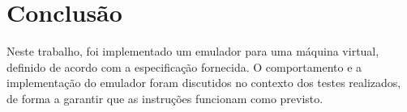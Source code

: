 \documentclass[10pt,a4paper]{article}
\numberwithin{equation}{section}
\begin{document}
\FloatBarrier

\section{Conclusão}

Neste trabalho, foi implementado um emulador para uma máquina virtual, definido de acordo com a especificação fornecida. O comportamento e a implementação do emulador foram discutidos no contexto dos testes realizados, de forma a garantir que as instruções funcionam como previsto.
\end{document}
